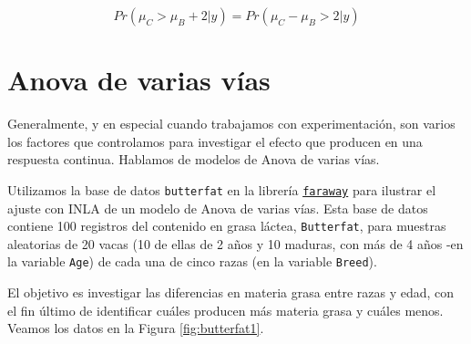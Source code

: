 \documentclass[
]{book}
\newenvironment{Shaded}{\begin{snugshade}}{\end{snugshade}}
\newcommand{\AttributeTok}[1]{\textcolor[rgb]{0.77,0.63,0.00}{#1}}
\newcommand{\CommentTok}[1]{\textcolor[rgb]{0.56,0.35,0.01}{\textit{#1}}}
\newcommand{\DecValTok}[1]{\textcolor[rgb]{0.00,0.00,0.81}{#1}}
\newcommand{\FunctionTok}[1]{\textcolor[rgb]{0.00,0.00,0.00}{#1}}
\newcommand{\NormalTok}[1]{#1}
\newcommand{\SpecialCharTok}[1]{\textcolor[rgb]{0.00,0.00,0.00}{#1}}
\newcommand{\StringTok}[1]{\textcolor[rgb]{0.31,0.60,0.02}{#1}}
\begin{document}
\[Pr(\mu_C>\mu_B+2|y)= Pr(\mu_C-\mu_B>2|y)\]

\begin{Shaded}
\end{Shaded}

\hypertarget{anova-de-varias-vuxedas}{%
\section{Anova de varias vías}\label{anova-de-varias-vuxedas}}

Generalmente, y en especial cuando trabajamos con experimentación, son varios los factores que controlamos para investigar el efecto que producen en una respuesta continua. Hablamos de modelos de Anova de varias vías.

Utilizamos la base de datos \texttt{butterfat} en la librería \href{https://cran.r-project.org/web/packages/faraway/faraway.pdf}{\texttt{faraway}} para ilustrar el ajuste con INLA de un modelo de Anova de varias vías. Esta base de datos contiene 100 registros del contenido en grasa láctea, \texttt{Butterfat}, para muestras aleatorias de 20 vacas (10 de ellas de 2 años y 10 maduras, con más de 4 años -en la variable \texttt{Age}) de cada una de cinco razas (en la variable \texttt{Breed}).

El objetivo es investigar las diferencias en materia grasa entre razas y edad, con el fin último de identificar cuáles producen más materia grasa y cuáles menos. Veamos los datos en la Figura \ref{fig:butterfat1}.

\begin{Shaded}
\end{Shaded}
\end{document}
